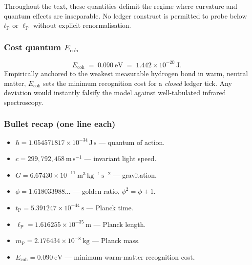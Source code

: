 \documentclass[11pt,oneside]{book}
\begin{document}
Throughout the text, these quantities delimit the regime where curvature and
quantum effects are inseparable.  No ledger construct is permitted to probe
below $t_{\text{P}}$ or $\ell_{\text{P}}$ without explicit renormalisation.

\subsubsection{Cost quantum \texorpdfstring{$E_{\text{coh}}$}{Ecoh}}
\label{subsubsec:cost-quantum}

\[
  E_{\text{coh}} \;=\; 0.090\ \mathrm{eV}
                   \;=\; 1.442\times10^{-20}\ \mathrm{J}.
\]
Empirically anchored to the weakest measurable hydrogen bond in warm,
neutral matter, $E_{\text{coh}}$ sets the minimum recognition cost for a
\emph{closed} ledger tick.  Any deviation would instantly falsify the model
against well-tabulated infrared spectroscopy.

\subsubsection{Bullet recap (one line each)}
\label{subsubsec:bullet-recap}
\begin{itemize}
  \item $\hbar = 1.054571817\times10^{-34}\,\mathrm{J\,s}$ — quantum of action.
  \item $c = 299{,}792{,}458\ \mathrm{m\,s^{-1}}$ — invariant light speed.
  \item $G = 6.67430\times10^{-11}\ \mathrm{m^{3}\,kg^{-1}\,s^{-2}}$ — gravitation.
  \item $\phi = 1.618033988\dots$ — golden ratio, $\phi^{2}=\phi+1$.
  \item $t_{\text{P}} = 5.391247\times10^{-44}\ \mathrm{s}$ — Planck time.
  \item $\ell_{\text{P}} = 1.616255\times10^{-35}\ \mathrm{m}$ — Planck length.
  \item $m_{\text{P}} = 2.176434\times10^{-8}\ \mathrm{kg}$ — Planck mass.
  \item $E_{\text{coh}} = 0.090\ \mathrm{eV}$ — minimum warm-matter recognition cost.
\end{itemize}
\end{document}
